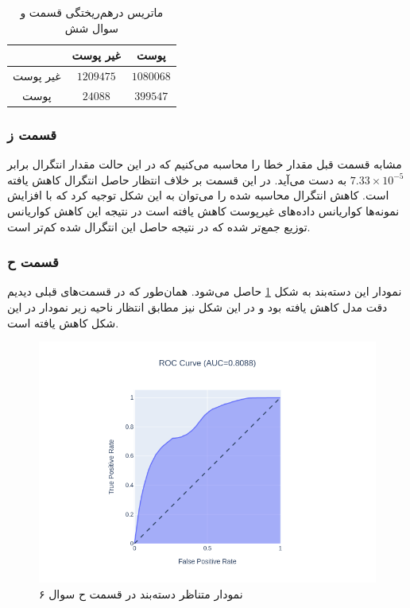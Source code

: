 \documentclass{article}
\begin{document}
\begin{table}[h]
    \centering
    \caption{ماتریس درهم‌ریختگی قسمت و سوال شش}
    \label{parti-partf-confusion-matrix}
    \begin{tabular}{c|c|c}
        & غیر پوست & پوست \\
        \hline
        غیر پوست & $1209475$ & $1080068$ \\
        پوست & $24088$ & $399547$
    \end{tabular}
\end{table}

\subsubsection*{قسمت ز}

مشابه قسمت قبل مقدار خطا را محاسبه می‌کنیم که در این حالت مقدار انتگرال برابر $7.33 \times 10^{-5}$ به دست می‌آید.
در این قسمت بر خلاف انتظار حاصل انتگرال کاهش یافته است. کاهش انتگرال محاسبه شده را می‌توان به این شکل توجیه کرد که
با افزایش نمونه‌ها کواریانس داده‌های غیرپوست کاهش یافته است در نتیجه این کاهش کواریانس توزیع جمع‌تر شده که در نتیجه
حاصل این انتگرال شده کم‌تر است.

\subsubsection*{قسمت ح}

نمودار  این دسته‌بند به شکل \ref{parti-roc} حاصل می‌شود. همان‌طور که در قسمت‌های قبلی دیدیم دقت مدل
کاهش یافته بود و در این شکل نیز مطابق انتظار ناحیه زیر نمودار در این شکل کاهش یافته است.

\begin{figure}[h]
    \centering
    \includegraphics[scale=0.3]{images/q6/parti_roc.png}
    \caption{نمودار  متناظر دسته‌بند در قسمت ح سوال ۶}
    \label{parti-roc}
\end{figure}
\end{document}
